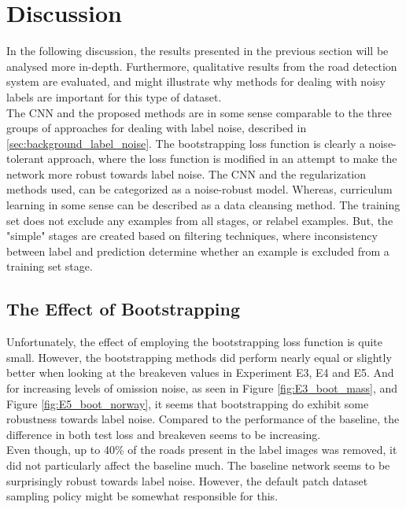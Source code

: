 \section{Discussion}
\label{sec:Discussion}
In the following discussion, the results presented in the previous section will be analysed more in-depth. Furthermore, qualitative results from the road detection system are evaluated, and might illustrate why methods for dealing with noisy labels are important for this type of dataset.\\

The \ac{CNN} and the proposed methods are in some sense comparable to the three groups of approaches for dealing with label noise, described in \ref{sec:background_label_noise}. The bootstrapping loss function is clearly a noise-tolerant approach, where the loss function is modified in an attempt to make the network more robust towards label noise. The \ac{CNN} and the regularization methods used, can be categorized as a noise-robust model. Whereas, curriculum learning in some sense can be described as a data cleansing method. The training set does not exclude any examples from all stages, or relabel examples. But, the "simple" stages are created based on filtering techniques, where inconsistency between label and prediction determine whether an example is excluded from a training set stage.  \\

\subsection{The Effect of Bootstrapping}
Unfortunately, the effect of employing the bootstrapping loss function is quite small. However, the bootstrapping methods did perform nearly equal or slightly better when looking at the breakeven values in Experiment E3, E4 and E5. And for increasing levels of omission noise,  as seen in Figure \ref{fig:E3_boot_mass}, and Figure \ref{fig:E5_boot_norway}, it seems that bootstrapping do exhibit some robustness towards label noise. Compared to the performance of the baseline, the difference in both test loss and breakeven seems to be increasing.  \\

Even though, up to 40\% of the roads present in the label images was removed, it did not particularly affect the baseline much. The baseline network seems to be surprisingly robust towards label noise. However, the default patch dataset sampling policy might be somewhat responsible for this.\\

